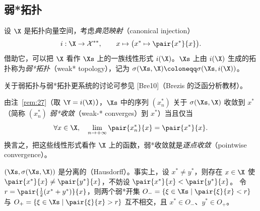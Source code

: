 \subsection{弱*拓扑}

\begin{definition}[弱*拓扑]
\label{def:39}
设 $\X$ 是拓扑向量空间，考虑\emph{典范映射}（canonical injection）
\[
  i:\X\to\Xss,\qquad x\mapsto\bigl(x^*\mapsto\pair{x^*}{x}\bigr).
\]
借助它，可以把 $\X$ 看作 $\Xs$ 上的一族线性形式 $i(\X)$。$\Xs$ 上由 $i(\X)$ 生成的拓扑称为\emph{弱*拓扑}（weak* topology），记为
$\sigma(\Xs,\X)\coloneqq\sigma(\Xs,i(\X))$。
\end{definition}

关于弱拓扑与弱*拓扑更系统的讨论可参见 [Bre10]（Brezis 的泛函分析教材）。

\begin{remark}[弱*收敛与逐点收敛]
\label{rem:29}
由注~\ref{rem:27}（取 $\Y=i(\X)$），$\Xs$ 中的序列 $(x^*_n)$ 关于 $\sigma(\Xs,\X)$ 收敛到 $x^*$（简称 $(x^*_n)$ \emph{弱*收敛}（weak-* converges）到 $x^*$）当且仅当
\[
  \forall x\in\X,\quad\lim_{n\to+\infty}\pair{x^*_n}{x}=\pair{x^*}{x}.
\]
换言之，把这些线性形式看作 $\X$ 上的函数，弱*收敛就是\emph{逐点收敛}（pointwise convergence）。
\end{remark}

\begin{remark}[分离性]
\label{rem:30}
$(\Xs,\sigma(\Xs,\X))$ 是分离的（Hausdorff）。事实上，设 $x^*\neq y^*$，则存在 $x\in\X$ 使 $\pair{x^*}{x}\neq\pair{y^*}{x}$，不妨设 $\pair{x^*}{x}<\pair{y^*}{x}$。
令 $r=\pair{\tfrac12(x^*+y^*)}{x}$，则两个弱*开集 $O_-=\{\xi\in\Xs\mid\pair{\xi}{x}<r\}$ 与 $O_+=\{\xi\in\Xs\mid\pair{\xi}{x}>r\}$ 互不相交，且 $x^*\in O_-$、$y^*\in O_+$。
\end{remark}

